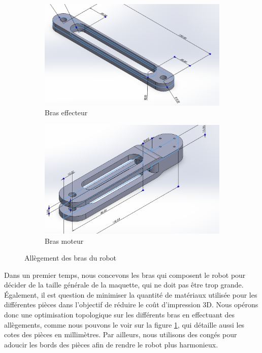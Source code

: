 \documentclass[a4paper, 11pt]{report}
\begin{document}
\begin{figure}[h]
    \centering
    \begin{subfigure}[t]{0.50\textwidth}
        \centering
        \includegraphics[width=\textwidth]{Figures/bras_effecteur.png}
        \caption{Bras effecteur}
    \end{subfigure}
    \hfill
    \begin{subfigure}[t]{0.45\textwidth}
        \centering
        \includegraphics[width=\textwidth]{Figures/bras_moteur.png}
        \caption{Bras moteur}
    \end{subfigure}
    \caption{Allègement des bras du robot}
    \label{fig:bras}
\end{figure}

Dans un premier temps, nous concevons les bras qui composent le robot pour décider de la taille générale de la maquette, qui ne doit pas être trop grande.
Également, il est question de minimiser la quantité de matériaux utilisée pour les différentes pièces dans l'objectif de réduire le coût d'impression 3D.
Nous opérons donc une optimisation topologique sur les différents bras en effectuant des allègements, comme nous pouvons le voir sur la figure \ref{fig:bras}, 
qui détaille aussi les cotes des pièces en millimètres. Par ailleurs, nous utilisons des congés pour adoucir les bords des pièces afin de rendre le robot plus harmonieux.
\end{document}
